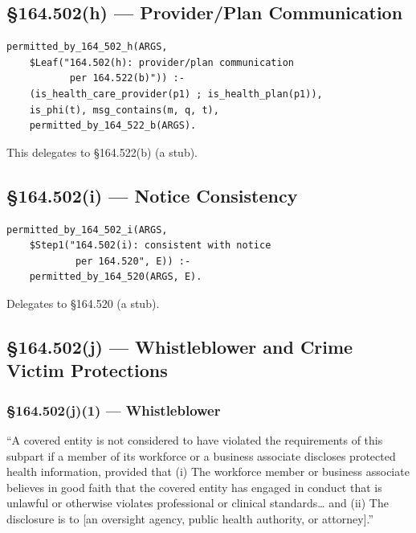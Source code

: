 \documentclass[11pt,letterpaper]{article}
\begin{document}
\subsection{\S 164.502(h) --- Provider/Plan Communication}

\begin{lstlisting}[style=soufflestyle,caption={\S 164.502(h)}]
permitted_by_164_502_h(ARGS,
    $Leaf("164.502(h): provider/plan communication
           per 164.522(b)")) :-
    (is_health_care_provider(p1) ; is_health_plan(p1)),
    is_phi(t), msg_contains(m, q, t),
    permitted_by_164_522_b(ARGS).
\end{lstlisting}

This delegates to \S 164.522(b) (a stub).

\subsection{\S 164.502(i) --- Notice Consistency}

\begin{lstlisting}[style=soufflestyle,caption={\S 164.502(i)}]
permitted_by_164_502_i(ARGS,
    $Step1("164.502(i): consistent with notice
            per 164.520", E)) :-
    permitted_by_164_520(ARGS, E).
\end{lstlisting}

Delegates to \S 164.520 (a stub).

\subsection{\S 164.502(j) --- Whistleblower and Crime Victim Protections}
\label{sec:502j}

\subsubsection{\S 164.502(j)(1) --- Whistleblower}

\begin{hipaabox}
``A covered entity is not considered to have violated the requirements of this subpart if a member of its workforce or a business associate discloses protected health information, provided that (i) The workforce member or business associate believes in good faith that the covered entity has engaged in conduct that is unlawful or otherwise violates professional or clinical standards\ldots{} and (ii) The disclosure is to [an oversight agency, public health authority, or attorney].''
\end{hipaabox}
\end{document}
